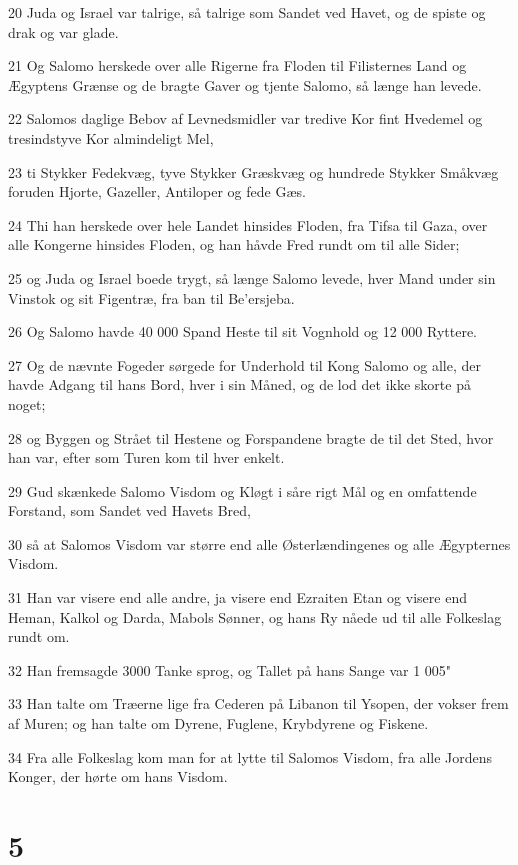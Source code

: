 \par 20 Juda og Israel var talrige, så talrige som Sandet ved Havet, og de spiste og drak og var glade.
\par 21 Og Salomo herskede over alle Rigerne fra Floden til Filisternes Land og Ægyptens Grænse og de bragte Gaver og tjente Salomo, så længe han levede.
\par 22 Salomos daglige Bebov af Levnedsmidler var tredive Kor fint Hvedemel og tresindstyve Kor almindeligt Mel,
\par 23 ti Stykker Fedekvæg, tyve Stykker Græskvæg og hundrede Stykker Småkvæg foruden Hjorte, Gazeller, Antiloper og fede Gæs.
\par 24 Thi han herskede over hele Landet hinsides Floden, fra Tifsa til Gaza, over alle Kongerne hinsides Floden, og han håvde Fred rundt om til alle Sider;
\par 25 og Juda og Israel boede trygt, så længe Salomo levede, hver Mand under sin Vinstok og sit Figentræ, fra ban til Be'ersjeba.
\par 26 Og Salomo havde 40 000 Spand Heste til sit Vognhold og 12 000 Ryttere.
\par 27 Og de nævnte Fogeder sørgede for Underhold til Kong Salomo og alle, der havde Adgang til hans Bord, hver i sin Måned, og de lod det ikke skorte på noget;
\par 28 og Byggen og Strået til Hestene og Forspandene bragte de til det Sted, hvor han var, efter som Turen kom til hver enkelt.
\par 29 Gud skænkede Salomo Visdom og Kløgt i såre rigt Mål og en omfattende Forstand, som Sandet ved Havets Bred,
\par 30 så at Salomos Visdom var større end alle Østerlændingenes og alle Ægypternes Visdom.
\par 31 Han var visere end alle andre, ja visere end Ezraiten Etan og visere end Heman, Kalkol og Darda, Mabols Sønner, og hans Ry nåede ud til alle Folkeslag rundt om.
\par 32 Han fremsagde 3000 Tanke sprog, og Tallet på hans Sange var 1 005"
\par 33 Han talte om Træerne lige fra Cederen på Libanon til Ysopen, der vokser frem af Muren; og han talte om Dyrene, Fuglene, Krybdyrene og Fiskene.
\par 34 Fra alle Folkeslag kom man for at lytte til Salomos Visdom, fra alle Jordens Konger, der hørte om hans Visdom.

\chapter{5}

